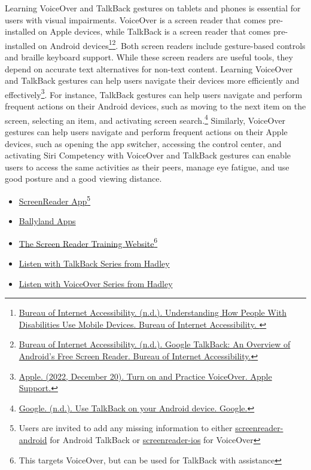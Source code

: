Learning VoiceOver and TalkBack gestures on tablets and phones is essential for users with visual impairments. VoiceOver is a screen reader that comes pre-installed on Apple devices, while TalkBack is a screen reader that comes pre-installed on Android devices\footnote{\raggedright \href{https://www.boia.org/blog/understanding-how-people-with-disabilities-use-mobile-devices}{Bureau of Internet Accessibility. (n.d.). Understanding How People With Disabilities Use Mobile Devices. Bureau of Internet Accessibility. }}\fnsep\footnote{\raggedright \href{https://www.boia.org/blog/google-talkback-an-overview-of-androids-free-screen-reader}{Bureau of Internet Accessibility. (n.d.). Google TalkBack: An Overview of Android’s Free Screen Reader. Bureau of Internet Accessibility.}}. Both screen readers include gesture-based controls and braille keyboard support. While these screen readers are useful tools, they depend on accurate text alternatives for non-text content. Learning VoiceOver and TalkBack gestures can help users navigate their devices more efficiently and effectively\footnote{\raggedright \href{https://support.apple.com/guide/iphone/turn-on-and-practice-voiceover-iph3e2e415f/ios}{Apple. (2022, December 20). Turn on and Practice VoiceOver. Apple Support.}}. For instance, TalkBack gestures can help users navigate and perform frequent actions on their Android devices, such as moving to the next item on the screen, selecting an item, and activating screen search.\footnote{\raggedright \href{https://support.google.com/accessibility/android/answer/6151827?hl=en}{Google. (n.d.). Use TalkBack on your Android device. Google.}} Similarly, VoiceOver gestures can help users navigate and perform frequent actions on their Apple devices, such as opening the app switcher, accessing the control center, and activating Siri Competency with VoiceOver and TalkBack gestures can enable users to access the same activities as their peers, manage eye fatigue, and use good posture and a good viewing distance.

\begin{itemize}[leftmargin=*]
 \item \href{https://screenreader.app/}{ScreenReader App}\footnote{\raggedright Users are invited to add any missing information to either \href{https://github.com/appt-org/screenreader-android}{screenreader-android} for Android TalkBack or \href{https://github.com/appt-org/screenreader-ios}{screenreader-ios} for VoiceOver}
 \item \href{https://www.sonokids.org/ballyland-early-learning/ballyland-game-apps/}{Ballyland Apps}
 \item \href{https://srt.csb-cde.ca.gov/}{The Screen Reader Training Website}\footnote{\raggedright This targets VoiceOver, but can be used for TalkBack with assistance}
 \item \href{https://hadley.edu/workshops/listen-with-talkback-series}{Listen with TalkBack Series from Hadley}
 \item \href{https://hadley.edu/workshops/listen-with-voiceover-series}{Listen with VoiceOver Series from Hadley}
\end{itemize}

